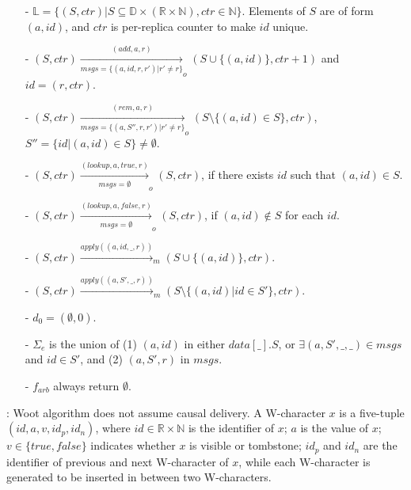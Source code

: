 {\color {red}
\begin{itemize}
\setlength{\itemsep}{0.5pt}
\item[-] $\mathbb{L} = \{ (S,\mathit{ctr}) \vert S \subseteq \mathbb{D} \times (\mathbb{R} \times \mathbb{N}), \mathit{ctr} \in \mathbb{N} \}$. Elements of $S$ are of form $(a,id)$, and $\mathit{ctr}$ is per-replica counter to make $id$ unique.

\item[-] $(S,\mathit{ctr}) \xrightarrow[\mathit{msgs} = \{ (a,\mathit{id},r,r') \vert r' \neq r \}]{(\mathit{add},a,r)}_o (S \cup \{ (a,\mathit{id}) \}, \mathit{ctr}+1)$ and $\mathit{id} = (r,\mathit{ctr})$.

\item[-] $(S,\mathit{ctr}) \xrightarrow[\mathit{msgs} = \{ (a,S'',r,r') \vert r' \neq r \} ]{(\mathit{rem},a,r)}_o (S \setminus \{ (a,id) \in S \}, \mathit{ctr})$, $S'' = \{ id \vert (a,id) \in S \} \neq \emptyset$.

\item[-] $(S,\mathit{ctr}) \xrightarrow[\mathit{msgs} = \emptyset]{(\mathit{lookup},a,\mathit{true},r)}_o (S, \mathit{ctr})$, if there exists $\mathit{id}$ such that $(a,\mathit{id}) \in S$.

\item[-] $(S,\mathit{ctr}) \xrightarrow[\mathit{msgs} = \emptyset]{(\mathit{lookup},a,\mathit{false},r)}_o (S, \mathit{ctr})$, if $(a,\mathit{id}) \notin S$ for each $\mathit{id}$.

\item[-] $(S,\mathit{ctr}) \xrightarrow{\mathit{apply}((a,id,\_,r))}_m (S \cup \{ (a,id) \}, \mathit{ctr})$.

\item[-] $(S,\mathit{ctr}) \xrightarrow{\mathit{apply}((a,S',\_,r))}_m (S \setminus \{ (a,id) \vert id \in S' \}, \mathit{ctr})$.

\item[-] $d_0 = (\emptyset,0)$.

\item[-] $\Sigma_e$ is the union of (1) $(a,id)$ in either $\mathit{data}[\_].S$, or $\exists (a,S',\_,\_) \in \mathit{msgs}$ and $id \in S'$, and (2) $(a,S',r)$ in $\mathit{msgs}$.

\item[-] $f_{\mathit{arb}}$ always return $\emptyset$.
\end{itemize}
}



: Woot algorithm does not assume causal delivery. A W-character $x$ is a five-tuple $(\mathit{id},a,v,\mathit{id}_p,\mathit{id}_n)$, where $\mathit{id} \in \mathbb{R} \times \mathbb{N}$ is the identifier of $x$; $a$ is the value of $x$; $v \in \{ \mathit{true},\mathit{false} \}$ indicates whether $x$ is visible or tombstone; $\mathit{id}_p$ and $\mathit{id}_n$ are the identifier of previous and next W-character of $x$, while each W-character is generated to be inserted in between two W-characters.

